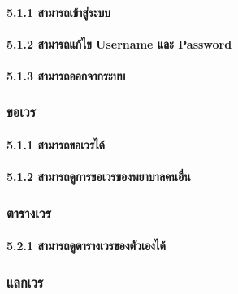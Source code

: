 \hspace{2.5cm}\paragraph{5.1.1 สามารถเข้าสู่ระบบ}

\hspace{2.5cm}\paragraph{5.1.2 สามารถแก้ไข Username และ Password}

\hspace{2.5cm}\paragraph{5.1.3 สามารถออกจากระบบ}

\hspace{1cm}\subsubsection{ขอเวร}

\hspace{2.5cm}\paragraph{5.1.1 สามารถขอเวรได้}

\hspace{2.5cm}\paragraph{5.1.2 สามารถดูการขอเวรของพยาบาลคนอื่น}

\hspace{1cm}\subsubsection{ตารางเวร}

\hspace{2.5cm}\paragraph{5.2.1 สามารถดูตารางเวรของตัวเองได้}

\hspace{1cm}\subsubsection{แลกเวร}

